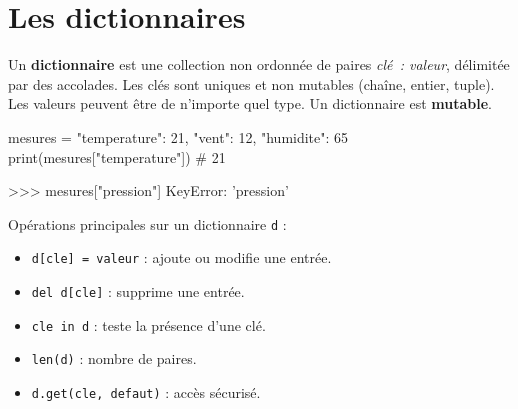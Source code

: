 \section{Les dictionnaires}
\label{sec:dictionnaires}


\begin{nxdef}[D9]
  Un \textbf{dictionnaire} est une collection non ordonnée de paires \emph{clé~: valeur},
  délimitée par des accolades. Les clés sont uniques et non mutables (chaîne, entier, tuple).
  Les valeurs peuvent être de n'importe quel type. Un dictionnaire est \textbf{mutable}.
\end{nxdef}


\begin{python}
mesures = {"temperature": 21, "vent": 12, "humidite": 65}
print(mesures["temperature"])  # 21
\end{python}



\begin{console}
>>> mesures["pression"]
KeyError: 'pression'
\end{console}


\begin{nxdef}[D10]
  Opérations principales sur un dictionnaire \lstinline{d} :
  \begin{itemize}
    \item \lstinline{d[cle] = valeur} : ajoute ou modifie une entrée.
    \item \lstinline{del d[cle]} : supprime une entrée.
    \item \lstinline{cle in d} : teste la présence d'une clé.
    \item \lstinline{len(d)} : nombre de paires.
    \item \lstinline{d.get(cle, defaut)} : accès sécurisé.
  \end{itemize}
\end{nxdef}


